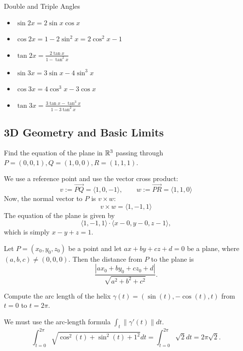 Double and Triple Angles

\begin{itemize}
\item $\sin 2x = 2\sin x\cos x$
\item $\cos 2x=1-2\sin^2x=2\cos^2x-1$
\item $\tan 2x=\frac{2\tan x}{1-\tan^2x}$
\item $\sin 3x=3\sin x-4\sin^3x$
\item $\cos 3x=4\cos^3x-3\cos x$
\item $\tan 3x=\frac{3\tan x-\tan^3x}{1-3\tan^2x}$
\end{itemize}

\subsection{3D Geometry and Basic Limits}

\begin{exercise}
    Find the equation of the plane in $\mathbb{R}^3$ passing through 
    $P=(0,0,1), Q=(1,0,0), R=(1,1,1)$.
\end{exercise}
\begin{solution}
    We use a reference point and use the vector cross product:
    \[
    v := \overrightarrow{PQ} = \langle 1,0,-1\rangle, \qquad 
    w := \overrightarrow{PR} = \langle 1, 1, 0\rangle
    \]
    Now, the normal vector to $P$ is $v \times w$:
    \[
    v \times w = \langle 1,-1,1 \rangle
    \]
    The equation of the plane is given by 
    \[
    \langle 1,-1,1\rangle \cdot \langle x-0, y-0, z-1 \rangle,
    \]
    which is simply $x-y+z = 1$.
\end{solution}

\begin{theorem}
Let $P=(x_0,y_0,z_0)$ be a point and let $ax+by+cz+d=0$ be 
a plane, where $(a,b,c)\neq(0,0,0)$. Then the distance from $P$ to the plane is
\[
\frac{|ax_0+by_0+cz_0+d|}
{\sqrt{a^2+b^2+c^2}}.
\]
\end{theorem}

\begin{exercise}
    Compute the arc length of the helix $\gamma(t) = (\sin(t),-\cos(t), t)$
    from $t = 0$ to $t = 2\pi$.
\end{exercise}
\begin{solution}
    We must use the arc-length formula $\int_t \lVert \gamma'(t) \rVert dt$.
    \[
    \int_{t = 0}^{2\pi} \sqrt{\cos^2(t) + \sin^2(t) + 1^2} dt 
        = \int_{t = 0}^{2\pi} \sqrt{2} dt = 2\pi \sqrt{2}.
    \]
\end{solution}

